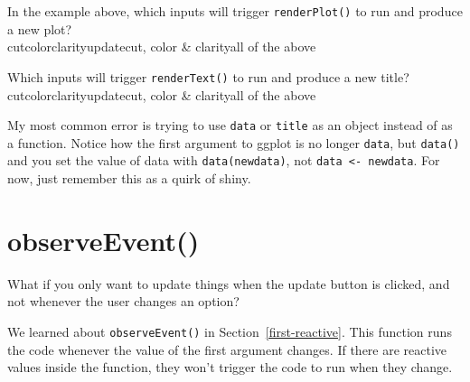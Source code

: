 \documentclass[
  oneside]{book}
\begin{document}
In the example above, which inputs will trigger \texttt{renderPlot}\texttt{()} to run and produce a new plot?\\
cutcolorclarityupdatecut, color \& clarityall of the above

Which inputs will trigger \texttt{renderText}\texttt{()} to run and produce a new title?\\
cutcolorclarityupdatecut, color \& clarityall of the above

\begin{warning}
My most common error is trying to use \texttt{data} or \texttt{title} as an object instead of as a function. Notice how the first argument to ggplot is no longer \texttt{data}, but \texttt{data}\texttt{()} and you set the value of data with \texttt{data(newdata)}, not \texttt{data\ \textless{}-\ newdata}. For now, just remember this as a quirk of shiny.

\end{warning}

\hypertarget{observeevent-1}{%
\section{observeEvent()}\label{observeevent-1}}

What if you only want to update things when the update button is clicked, and not whenever the user changes an option?

We learned about \texttt{observeEvent}\texttt{()} in Section~\ref{first-reactive}. This function runs the code whenever the value of the first argument changes. If there are reactive values inside the function, they won't trigger the code to run when they change.
\end{document}

